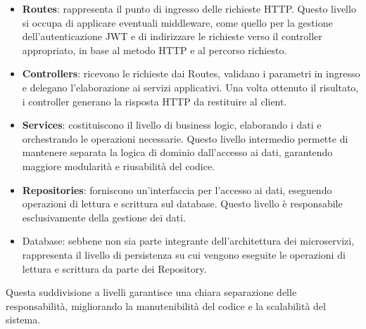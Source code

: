 \begin{itemize}
  \item \textbf{Routes}: rappresenta il punto di ingresso delle richieste HTTP. Questo livello si occupa di applicare eventuali middleware, come quello per la gestione dell'autenticazione JWT e di indirizzare le richieste verso il controller appropriato, in base al metodo HTTP e al percorso richiesto.

  \item \textbf{Controllers}: ricevono le richieste dai Routes, validano i parametri in ingresso e delegano l'elaborazione ai servizi applicativi. Una volta ottenuto il risultato, i controller generano la risposta HTTP da restituire al client.

  \item \textbf{Services}: costituiscono il livello di business logic, elaborando i dati e orchestrando le operazioni necessarie. Questo livello intermedio permette di mantenere separata la logica di dominio dall'accesso ai dati, garantendo maggiore modularità e riusabilità del codice.

  \item \textbf{Repositories}: forniscono un'interfaccia per l'accesso ai dati, eseguendo operazioni di lettura e scrittura sul database. Questo livello è responsabile esclusivamente della gestione dei dati.

  \item Database: sebbene non sia parte integrante dell'architettura dei microservizi, rappresenta il livello di persistenza su cui vengono eseguite le operazioni di lettura e scrittura da parte dei Repository.
\end{itemize}

Questa suddivisione a livelli garantisce una chiara separazione delle responsabilità, migliorando la manutenibilità del codice e la scalabilità del sistema.

